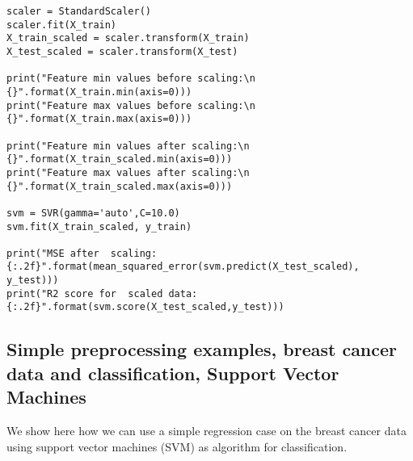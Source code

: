\documentclass[%
oneside,                 %
final,                   %
10pt]{article}
\begin{document}
\begin{verbatim}
scaler = StandardScaler()
scaler.fit(X_train)
X_train_scaled = scaler.transform(X_train)
X_test_scaled = scaler.transform(X_test)

print("Feature min values before scaling:\n {}".format(X_train.min(axis=0)))
print("Feature max values before scaling:\n {}".format(X_train.max(axis=0)))

print("Feature min values after scaling:\n {}".format(X_train_scaled.min(axis=0)))
print("Feature max values after scaling:\n {}".format(X_train_scaled.max(axis=0)))

svm = SVR(gamma='auto',C=10.0)
svm.fit(X_train_scaled, y_train)

print("MSE after  scaling: {:.2f}".format(mean_squared_error(svm.predict(X_test_scaled), y_test)))
print("R2 score for  scaled data: {:.2f}".format(svm.score(X_test_scaled,y_test)))

\end{verbatim}



\subsection*{Simple preprocessing examples, breast cancer data and classification, Support Vector Machines}

We show here how we can use a simple regression case on the breast
cancer data using support vector machines (SVM) as algorithm for
classification.
\end{document}
